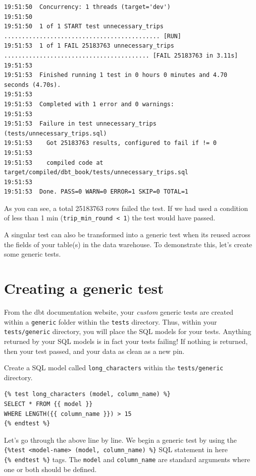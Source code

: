 \documentclass[
]{book}
\begin{document}
\begin{verbatim}
19:51:50  Concurrency: 1 threads (target='dev')
19:51:50  
19:51:50  1 of 1 START test unnecessary_trips ............................................ [RUN]
19:51:53  1 of 1 FAIL 25183763 unnecessary_trips ......................................... [FAIL 25183763 in 3.11s]
19:51:53  
19:51:53  Finished running 1 test in 0 hours 0 minutes and 4.70 seconds (4.70s).
19:51:53  
19:51:53  Completed with 1 error and 0 warnings:
19:51:53  
19:51:53  Failure in test unnecessary_trips (tests/unnecessary_trips.sql)
19:51:53    Got 25183763 results, configured to fail if != 0
19:51:53  
19:51:53    compiled code at target/compiled/dbt_book/tests/unnecessary_trips.sql
19:51:53  
19:51:53  Done. PASS=0 WARN=0 ERROR=1 SKIP=0 TOTAL=1
\end{verbatim}

As you can see, a total 25183763 rows failed the test. If we had used a condition of less than 1 min (\texttt{trip\_min\_round\ \textless{}\ 1}) the test would have passed.

A singular test can also be transformed into a generic test when its reused across the fields of your table(s) in the data warehouse. To demonstrate this, let's create some generic tests.

\hypertarget{creating-a-generic-test}{%
\section{Creating a generic test}\label{creating-a-generic-test}}

From the dbt documentation website, your \emph{custom} generic tests are created within a \texttt{generic} folder within the \texttt{tests} directory. Thus, within your \texttt{tests/generic} directory, you will place the SQL models for your tests. Anything returned by your SQL models is in fact your tests failing! If nothing is returned, then your test passed, and your data as clean as a new pin.

Create a SQL model called \texttt{long\_characters} within the \texttt{tests/generic} directory.

\begin{verbatim}
{% test long_characters (model, column_name) %}
SELECT * FROM {{ model }}
WHERE LENGTH({{ column_name }}) > 15 
{% endtest %}
\end{verbatim}

Let's go through the above line by line. We begin a generic test by using the \texttt{\{\%test\ \textless{}model-name\textgreater{}\ (model,\ column\_name)\ \%\}} SQL statement in here \texttt{\{\%\ endtest\ \%\}} tags. The \texttt{model} and \texttt{column\_name} are standard arguments where one or both should be defined.
\end{document}
